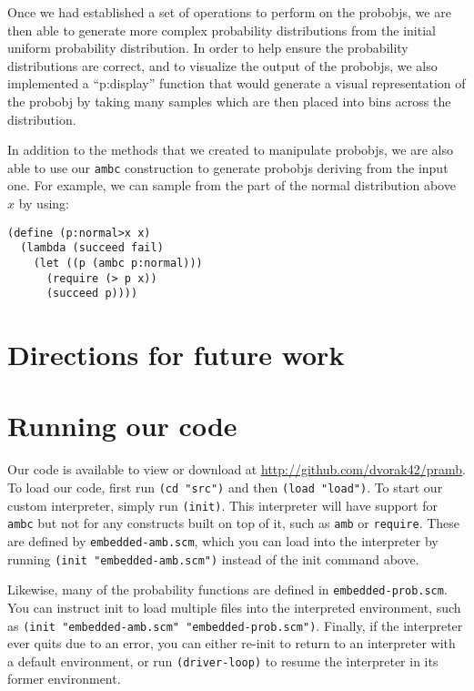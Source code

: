 \documentclass{article}
\begin{document}
Once we had established a set of operations to perform on the
{probobj}s, we are then able to generate more complex probability
distributions from the initial uniform probability distribution. In order to
help ensure the probability distributions are correct, and to visualize the
output of the {probobj}s, we also implemented a ``p:display'' function
that would generate a visual representation of the {probobj} by taking
many samples which are then placed into bins across the distribution.

In addition to the methods that we created to manipulate {probobj}s, we
are also able to use our \texttt{ambc} construction to generate
{probobj}s deriving from the input one. For example, we can sample from
the part of the normal distribution above $x$ by using:

\begin{lstlisting}
(define (p:normal>x x)
  (lambda (succeed fail)
    (let ((p (ambc p:normal)))
      (require (> p x))
      (succeed p))))
\end{lstlisting}

\section{Directions for future work}

\appendix

\section{Running our code}

Our code is available to view or download at
\url{http://github.com/dvorak42/pramb}. To load our code, first run \texttt{(cd
"src")} and then \texttt{(load "load")}. To start our custom interpreter,
simply run \texttt{(init)}. This interpreter will have support for
\texttt{ambc} but not for any constructs built on top of it, such as
\texttt{amb} or \texttt{require}. These are defined by
\texttt{embedded-amb.scm}, which you can load into the interpreter by running
\texttt{(init "embedded-amb.scm")} instead of the init command above.

Likewise, many of the probability functions are defined in
\texttt{embedded-prob.scm}. You can instruct init to load multiple files into
the interpreted environment, such as \texttt{(init "embedded-amb.scm"
"embedded-prob.scm")}. Finally, if the interpreter ever quits due to an error,
you can either re-init to return to an interpreter with a default environment,
or run \texttt{(driver-loop)} to resume the interpreter in its former
environment.
\end{document}
